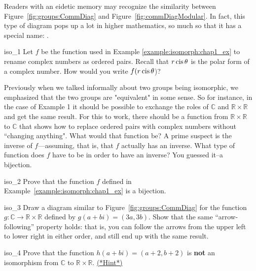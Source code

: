 \begin{rem}
Readers with an eidetic memory may recognize the similarity between Figure~\ref{fig:groups:CommDiag} and Figure~\ref{fig:commDiagModular}. In fact, this type of diagram pops up a lot in higher mathematics, so much so that it has a special name: .
\end{rem}

\begin{exercise}{iso_1}
Let $f$ be  the function used in Example \ref{example:isomorph:chap1_ex} to rename complex numbers as ordered pairs. Recall that $r \operatorname{cis} \theta$ is the polar form of a complex number. How would you write $f(r \operatorname{cis} \theta$)?
\end{exercise}

Previously when we talked informally about two groups being isomorphic, we emphasized that  the two groups are "equivalent"  in some sense.  So for instance, in the case of Example 1 it should be possible to exchange the roles of  ${\mathbb C}$ and ${\mathbb R} \times {\mathbb R}$ and get the same result.  For this to work, there should  be a function from ${\mathbb R} \times {\mathbb R}$ to ${\mathbb C}$  that shows how to replace ordered pairs with complex numbers without ``changing anything".  What would that function be?  A prime suspect is the inverse of $f$---assuming, that is, that $f$ actually has an inverse.  What type of function does $f$ have to be in order to have an inverse?  You guessed it--a bijection.

\begin{exercise}{iso_2}
Prove that the function $f$ defined in Example~\ref{example:isomorph:chap1_ex}  is a bijection.
\end{exercise}

\begin{exercise}{iso_3} 
Draw a diagram similar to Figure~\ref{fig:groups:CommDiag}  for the function $g: {\mathbb C} \rightarrow {\mathbb R} \times {\mathbb R}$ defined by $g(a + bi) = (3a, 3b)$. Show that the same ``arrow-following'' property holds: that is, you can follow the arrows from the upper left to lower right in either order, and still end up with the same result.
\end{exercise} 

\begin{exercise}{iso_4}
Prove that the function $h(a + bi) = (a+2, b+2)$ is {\bf not} an isomorphism from ${\mathbb C}$ to  ${\mathbb R} \times {\mathbb R}$.
\hyperref[sec:isomorph:hints]{(*Hint*)}
 \end{exercise}


